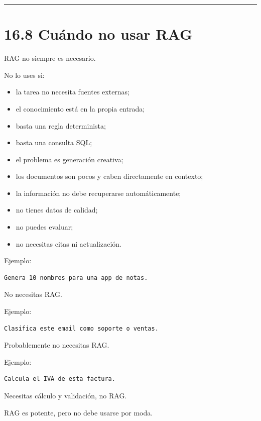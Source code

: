\begin{center}\rule{0.5\linewidth}{0.5pt}\end{center}

\section{16.8 Cuándo no usar RAG}\label{cuuxe1ndo-no-usar-rag}

RAG no siempre es necesario.

No lo uses si:

\begin{itemize}
\tightlist
\item
  la tarea no necesita fuentes externas;
\item
  el conocimiento está en la propia entrada;
\item
  basta una regla determinista;
\item
  basta una consulta SQL;
\item
  el problema es generación creativa;
\item
  los documentos son pocos y caben directamente en contexto;
\item
  la información no debe recuperarse automáticamente;
\item
  no tienes datos de calidad;
\item
  no puedes evaluar;
\item
  no necesitas citas ni actualización.
\end{itemize}

Ejemplo:

\begin{lstlisting}
Genera 10 nombres para una app de notas.
\end{lstlisting}

No necesitas RAG.

Ejemplo:

\begin{lstlisting}
Clasifica este email como soporte o ventas.
\end{lstlisting}

Probablemente no necesitas RAG.

Ejemplo:

\begin{lstlisting}
Calcula el IVA de esta factura.
\end{lstlisting}

Necesitas cálculo y validación, no RAG.

RAG es potente, pero no debe usarse por moda.

